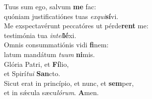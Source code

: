 \evenverse Tuus sum ego, salvum \textbf{me} fac:~\*\\
\evenverse quóniam justificatiónes tuas \textit{ex}\textit{qui}\textbf{sí}vi.\\
\oddverse Me exspectavérunt peccatóres ut pérde\textbf{rent} me:~\*\\
\oddverse testimónia tua \textit{in}\textit{tel}\textbf{lé}xi.\\
\evenverse Omnis consummatiónis vidi \textbf{fi}nem:~\*\\
\evenverse latum mandátum \textit{tu}\textit{um} \textbf{ni}mis.\\
\oddverse Glória Patri, et \textbf{Fí}lio,~\*\\
\oddverse et Spirí\textit{tu}\textit{i} \textbf{San}cto.\\
\evenverse Sicut erat in princípio, et nunc, et \textbf{sem}per,~\*\\
\evenverse et in sǽcula sæcu\textit{ló}\textit{rum}. \textbf{A}men.\\
